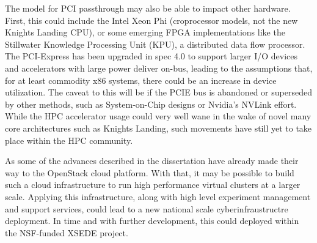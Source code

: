 The model for PCI passthrough may also be able to impact other hardware. First, this could include the Intel Xeon Phi (croprocessor models, not the new Knights Landing CPU), or some emerging FPGA implementations like the Stillwater Knowledge Processing Unit (KPU), a distributed data flow processor.  The PCI-Express has been upgraded in spec 4.0 to support larger I/O devices and accelerators with large power deliver on-bus, leading to the assumptions that, for at least commodity x86 systems, there could be an increase in device utilization. The caveat to this will be if the PCIE bus is abandoned or superseded by other methods, such as System-on-Chip designs or Nvidia's NVLink effort.  While the HPC accelerator usage could very well wane in the wake of novel many core architectures such as Knights Landing, such movements have still yet to take place within the HPC community.  

As some of the advances described in the dissertation have already made their way to the OpenStack cloud platform. With that, it may be possible to build such a cloud infrastructure to run high performance virtual clusters at a larger scale. Applying this infrastructure, along with high level experiment management and support services, could lead to a new national scale cyberinfraustructre deployment.  In time and with further development, this could deployed within the NSF-funded XSEDE project.  

